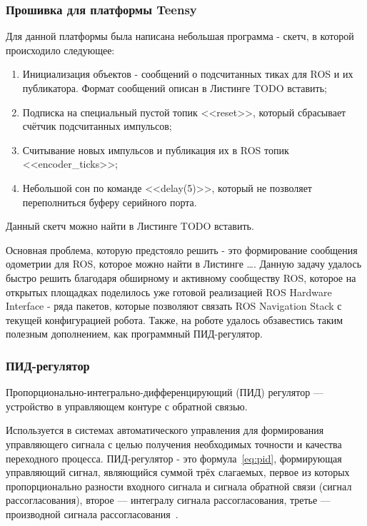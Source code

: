 \subsubsection{Прошивка для платформы Teensy}
Для данной платформы была написана небольшая программа - скетч, в которой происходило следующее:

\begin{enumerate}[beginpenalty=10000] %
  \item Инициализация объектов - сообщений о подсчитанных тиках для ROS и их публикатора. Формат сообщений описан в Листинге TODO вставить;
  \item Подписка на специальный пустой топик <<reset>>, который сбрасывает счётчик подсчитанных импульсов;
  \item Считывание новых импульсов и публикация их в ROS топик <<encoder\_ticks>>; 
  \item Небольшой сон по команде <<delay(5)>>, который не позволяет переполниться буферу серийного порта.
\end{enumerate}

Данный скетч можно найти в Листинге TODO вставить.

Основная проблема, которую предстояло решить - это формирование сообщения одометрии для ROS, которое можно найти в Листинге \ldots. Данную задачу удалось быстро решить благодаря обширному и активному сообществу ROS, которое на открытых площадках поделилось уже готовой реализацией ROS Hardware Interface - ряда пакетов, которые позволяют связать ROS Navigation Stack с текущей конфигурацией робота. Также, на роботе удалось обзавестись таким полезным дополнением, как программный ПИД-регулятор.

\subsubsection{ПИД-регулятор} 
Пропорционально-интегрально-дифференцирующий (ПИД) регулятор — устройство в управляющем контуре с обратной связью. 

Используется в системах автоматического управления для формирования управляющего сигнала с целью получения необходимых точности и качества переходного процесса. ПИД-регулятор - это формула~\cref{eq:pid}, формирующая управляющий сигнал, являющийся суммой трёх слагаемых, первое из которых пропорционально разности входного сигнала и сигнала обратной связи (сигнал рассогласования), второе — интегралу сигнала рассогласования, третье — производной сигнала рассогласования~\cite{pid}. 

